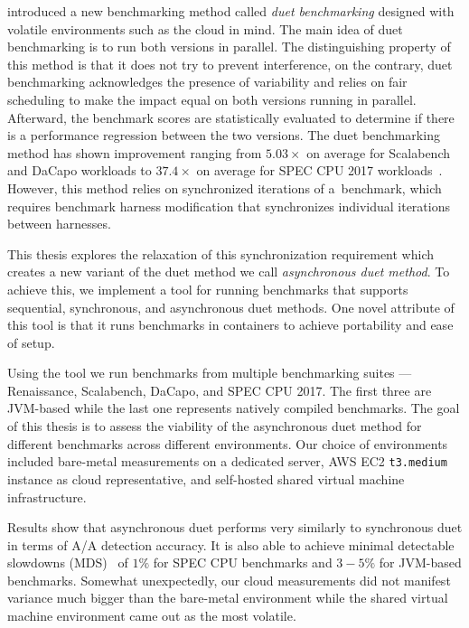 \citet{bulej2020duet} introduced a new benchmarking method called \emph{duet benchmarking} designed with volatile environments such as the cloud in mind.
The main idea of duet benchmarking is to run both versions in parallel.
The distinguishing property of this method is that it does not try to prevent interference, on the contrary, duet benchmarking acknowledges the presence of variability and relies on fair scheduling to make the impact equal on both versions running in parallel.
Afterward, the benchmark scores are statistically evaluated to determine if there is a performance regression between the two versions.
The duet benchmarking method has shown improvement ranging from $5.03 \times$ on average for Scalabench and DaCapo workloads to $37.4 \times$ on average for SPEC CPU 2017 workloads~\cite{bulej2020duet}.
However, this method relies on synchronized iterations of a~benchmark, which requires benchmark harness modification that synchronizes individual iterations between harnesses.

This thesis explores the relaxation of this synchronization requirement which creates a new variant of the duet method we call \emph{asynchronous duet method}.
To achieve this, we implement a tool for running benchmarks that supports sequential, synchronous, and asynchronous duet methods.
One novel attribute of this tool is that it runs benchmarks in containers to achieve portability and ease of setup.

Using the tool we run benchmarks from multiple benchmarking suites --- Renaissance, Scalabench, DaCapo, and SPEC CPU 2017.
The first three are \mbox{JVM-based} while the last one represents natively compiled benchmarks.
The goal of this thesis is to assess the viability of the asynchronous duet method for different benchmarks across different environments.
Our choice of environments included bare-metal measurements on a dedicated server, AWS EC2 \lstinline{t3.medium} instance as cloud representative, and self-hosted shared virtual machine infrastructure.

Results show that asynchronous duet performs very similarly to synchronous duet in terms of A/A detection accuracy.
It is also able to achieve minimal detectable slowdowns (MDS)~\cite{laaber2019software} of $1\%$ for SPEC CPU benchmarks and $3-5\%$ for \mbox{JVM-based} benchmarks.
Somewhat unexpectedly, our cloud measurements did not manifest variance much bigger than the \mbox{bare-metal} environment while the shared virtual machine environment came out as the most volatile.


